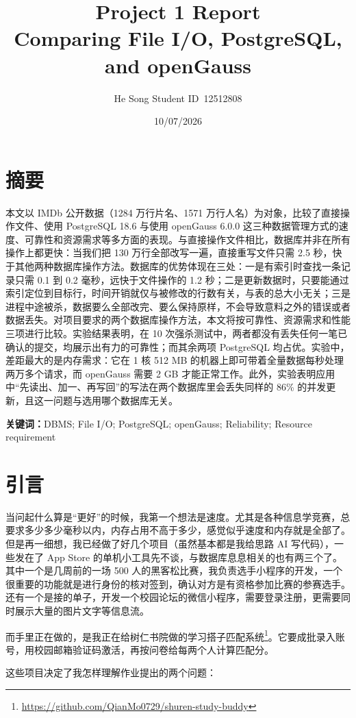 \documentclass[UTF8,a4paper,zihao=5,fontset=none]{ctexart}
\title{\sffamily\bfseries Project 1 Report\\[4pt]\Large Comparing File I/O, PostgreSQL, and openGauss}
\author{He Song \quad Student ID\ 12512808}
\date{10/07/2026}
\renewenvironment{abstract}
  {\section*{摘要}}
  {\par\medskip}
\begin{document}
\maketitle

\begin{abstract}
本文以 IMDb 公开数据（1284 万行片名、1571 万行人名）为对象，比较了直接操作文件、使用 PostgreSQL 18.6 与使用 openGauss 6.0.0 这三种数据管理方式的速度、可靠性和资源需求等多方面的表现。与直接操作文件相比，数据库并非在所有操作上都更快：当我们把 130 万行全部改写一遍，直接重写文件只需 2.5 秒，快于其他两种数据库操作方法。数据库的优势体现在三处：一是有索引时查找一条记录只需 0.1 到 0.2 毫秒，远快于文件操作的 1.2 秒；二是更新数据时，只要能通过索引定位到目标行，时间开销就仅与被修改的行数有关，与表的总大小无关；三是进程中途被杀，数据要么全部改完、要么保持原样，不会导致意料之外的错误或者数据丢失。对项目要求的两个数据库操作方法，本文将按可靠性、资源需求和性能三项进行比较。实验结果表明，在 10 次强杀测试中，两者都没有丢失任何一笔已确认的提交，均展示出有力的可靠性；而其余两项 PostgreSQL 均占优。实验中，差距最大的是内存需求：它在 1 核 512 MB 的机器上即可带着全量数据每秒处理两万多个请求，而 openGauss 需要 2 GB 才能正常工作。此外，实验表明应用中“先读出、加一、再写回”的写法在两个数据库里会丢失同样的 86\% 的并发更新，且这一问题与选用哪个数据库无关。

\noindent\textbf{关键词：}DBMS; File I/O; PostgreSQL; openGauss; Reliability; Resource requirement
\end{abstract}

\section{引言}

当问起什么算是“更好”的时候，我第一个想法是速度。尤其是各种信息学竞赛，总要求多少多少毫秒以内，内存占用不高于多少，感觉似乎速度和内存就是全部了。但是再一细想，我已经做了好几个项目（虽然基本都是我给思路 AI 写代码），一些发在了 App Store 的单机小工具先不谈，与数据库息息相关的也有两三个了。其中一个是几周前的一场 500 人的黑客松比赛，我负责选手小程序的开发，一个很重要的功能就是进行身份的核对签到，确认对方是有资格参加比赛的参赛选手。还有一个是接的单子，开发一个校园论坛的微信小程序，需要登录注册，更需要同时展示大量的图片文字等信息流。

而手里正在做的，是我正在给树仁书院做的学习搭子匹配系统\footnote{\url{https://github.com/QianMo0729/shuren-study-buddy}}。它要成批录入账号，用校园邮箱验证码激活，再按问卷给每两个人计算匹配分。

这些项目决定了我怎样理解作业提出的两个问题：
\end{document}

